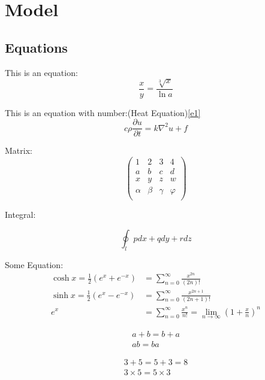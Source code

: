 \documentclass[12pt]{article}  %
\begin{document}
\section{Model}
\lipsum[1-4]

\subsection{Equations}

This is an equation:$$\frac{x}{y}=\frac{\sqrt[3]{x}}{\ln a}$$

This is an equation with number:(Heat Equation)\ref{e1}
\begin{equation}\label{e1}
    c\rho\frac{\partial u}{\partial t}=k\nabla^2u+f
\end{equation}

Matrix:
\begin{equation}
    \left( \begin{matrix}\label{e2}
        1      & 2     & 3      & 4       \\
        a      & b     & c      & d       \\
        x      & y     & z      & w       \\
        \alpha & \beta & \gamma & \varphi \\
    \end{matrix} \right)
\end{equation}


Integral:

$$
    \oint_l{pdx+qdy+rdz}
$$

Some Equation:
\begin{align}
    \cosh x = \frac {1}{2} (e^x + e^{-x}) & = \sum_{n = 0}^{\infty} \frac {x^{2n}}{(2n)!}                                                \\
    \sinh x = \frac {1}{2} (e^x - e^{-x}) & = \sum_{n = 0}^{\infty} \frac {x^{2n + 1}}{(2n + 1)!}                                        \\
    e^x                                   & = \sum_{n = 0}^{\infty} \frac {x^n}{n!} = \lim_{n\to\infty} \left (1+\frac{x}{n} \right )^n 
\end{align}

\begin{gather}
    a + b = b + a \\
    ab = ba
\end{gather}

\begin{gather*}
    3 + 5 = 5 + 3 = 8 \\
    3 \times 5 = 5 \times 3
\end{gather*}
\end{document}
